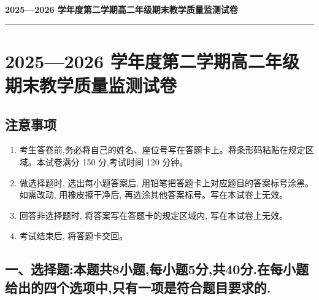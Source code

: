 \documentclass[UTF8,12pt,a4paper]{ctexart}
\renewcommand{\labelenumi}{\arabic{enumi}.}
\begin{document}
\color{ExamInk}

\begin{center}
  {\LARGE\bfseries\color{ExamNavy}2025---2026 学年度第二学期高二年级期末教学质量监测试卷\par}
  \vspace{0.35em}
  {\color{ExamGold}\rule{0.28\textwidth}{1.2pt}}
\end{center}
\vspace{0.8em}


\section{2025---2026 学年度第二学期高二年级期末教学质量监测试卷}\label{ux5b66ux5e74ux5ea6ux7b2cux4e8cux5b66ux671fux9ad8ux4e8cux5e74ux7ea7ux671fux672bux6559ux5b66ux8d28ux91cfux76d1ux6d4bux8bd5ux5377}

\subsection{注意事项}\label{ux6ce8ux610fux4e8bux9879}

\begin{enumerate}
\def\labelenumi{\arabic{enumi}.}
\item
  考生答卷前,务必将自己的姓名、座位号写在答题卡上。将条形码粘贴在规定区域。本试卷满分 150 分,考试时间 120 分钟。
\item
  做选择题时, 选出每小题答案后, 用铅笔把答题卡上对应题目的答案标号涂黑。如需改动, 用橡皮擦干净后, 再选涂其他答案标号。写在本试卷上无效。
\item
  回答非选择题时, 将答案写在答题卡的规定区域内, 写在本试卷上无效。
\item
  考试结束后, 将答题卡交回。
\end{enumerate}

\subsection{一、选择题:本题共8小题,每小题5分,共40分.在每小题给出的四个选项中,只有一项是符合题目要求的.}\label{ux4e00ux9009ux62e9ux9898ux672cux9898ux51718ux5c0fux9898ux6bcfux5c0fux98985ux5206ux517140ux5206.ux5728ux6bcfux5c0fux9898ux7ed9ux51faux7684ux56dbux4e2aux9009ux9879ux4e2dux53eaux6709ux4e00ux9879ux662fux7b26ux5408ux9898ux76eeux8981ux6c42ux7684.}
\end{document}

